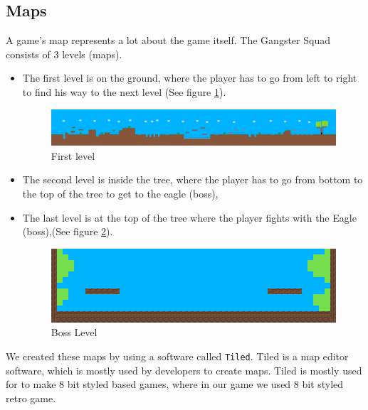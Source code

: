 \documentclass[12p]{article}
\begin{document}

\subsection{Maps} \label{DocMaps}
A game's map represents a lot about the game itself. The Gangster Squad consists of 3 levels (maps).

\begin{itemize}
 \item The first level is on the ground, where the player has to go from left to right to find his way to the next level (See figure \ref{fig:FirstLevel}).
 
\begin{figure}[ht]
  \center
  \includegraphics[width=1\textwidth]{Documentation/level_1.png}
  \caption{First level}
  \label{fig:FirstLevel}
\end{figure}

 \item The second level is inside the tree, where the player has to go from bottom to the top of the tree to get to the eagle (boss),

 \item The last level is at the top of the tree where the player fights with the Eagle (boss),(See figure \ref{fig:BossLevel}).
 
 \begin{figure}[ht]
  \center
  \includegraphics[width=1\textwidth]{Documentation/boss_level.png}
  \caption{Boss Level}
  \label{fig:BossLevel}
\end{figure}
\end{itemize}

We created these maps by using a software called \texttt{Tiled}. Tiled is a map editor software, which is mostly used by developers to create maps. Tiled is mostly used for to make 8 bit styled based games, where in our game we used 8 bit styled retro game.
\end{document}
